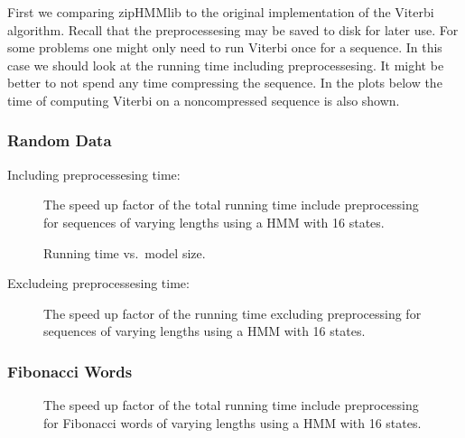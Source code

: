 First we comparing zipHMMlib to the original implementation of the Viterbi
algorithm. Recall that the preprocessesing may be saved to disk for later
use. For some problems one might only need to run Viterbi once for a
sequence. In  this case we should look at the running time including
preprocessesing. It might be better to not spend any time compressing the
sequence. In the plots below the time of computing Viterbi on a noncompressed
sequence is also shown.

%   

\subsubsection{Random Data}
\label{sec:random-data}

Including preprocessesing time:
\begin{figure}[H]
  \centering
  
  \caption{The speed up factor of the total running time include preprocessing
    for sequences of varying lengths using a HMM with 16 states.}
  \label{fig:speedup_vs_sequence_length}
\end{figure}

\begin{figure}[H]
  \centering
  
  \caption{Running time vs.\ model size.}
  \label{fig:speedup_vs_k}
\end{figure}

Excludeing preprocessesing time:
\begin{figure}[H]
  \centering
  
  \caption{The speed up factor of the running time excluding preprocessing for
    sequences of varying lengths using a HMM with 16 states.}
  \label{fig:speedup_vs_sequence_length2}
\end{figure}

\subsubsection{Fibonacci Words}
\label{sec:fibonacci-words-1}

\begin{figure}[H]
  \centering
  
  \caption{The speed up factor of the total running time include preprocessing
    for Fibonacci words of varying lengths using a HMM with 16 states.}
  \label{fig:fib_speedup_vs_sequence_length}
\end{figure}

